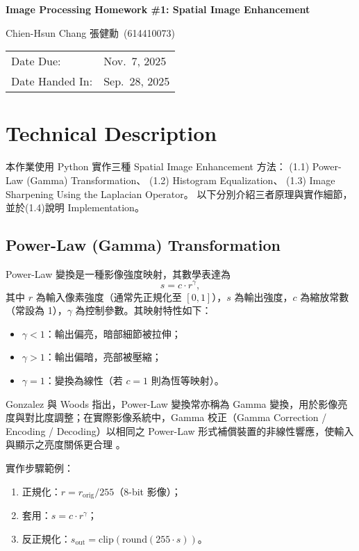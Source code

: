 \documentclass[12pt,a4paper]{article}
\newcommand{\HomeworkTitle}{Image Processing Homework \#1: Spatial Image Enhancement}
\newcommand{\StudentName}{Chien-Hsun Chang 張健勳}
\newcommand{\StudentID}{614410073}
\newcommand{\StudentInfo}{\StudentName~(\StudentID)}
\newcommand{\DateDue}{Nov.\ 7, 2025}
\newcommand{\DateHandedIn}{Sep.\ 28, 2025}
\begin{document}
\begin{titlepage}
  \centering
  {\vspace*{2cm}\Huge\bfseries \HomeworkTitle\par}
  \vspace{2cm}
  {\Large \StudentInfo\par}
  \vfill
  \begin{tabular}{@{}ll@{}}
    Date Due: & \DateDue \\
    Date Handed In: & \DateHandedIn \\
  \end{tabular}
  \vfill
\end{titlepage}

\section{Technical Description}
本作業使用 Python 實作三種 Spatial Image Enhancement 方法：
(1.1) Power-Law (Gamma) Transformation、
(1.2) Histogram Equalization、
(1.3) Image Sharpening Using the Laplacian Operator。
以下分別介紹三者原理與實作細節，並於(1.4)說明 Implementation。

\subsection{Power-Law (Gamma) Transformation}
Power-Law 變換是一種影像強度映射，其數學表達為
\[
s = c \cdot r^{\gamma},
\]
其中 \(r\) 為輸入像素強度（通常先正規化至 \([0,1]\)），\(s\) 為輸出強度，\(c\) 為縮放常數（常設為 1），\(\gamma\) 為控制參數。其映射特性如下：
\begin{itemize}
  \item \(\gamma < 1\)：輸出偏亮，暗部細節被拉伸；
  \item \(\gamma > 1\)：輸出偏暗，亮部被壓縮；
  \item \(\gamma = 1\)：變換為線性（若 \(c=1\) 則為恆等映射）。
\end{itemize}

Gonzalez 與 Woods 指出，Power-Law 變換常亦稱為 Gamma 變換，用於影像亮度與對比度調整；在實際影像系統中，Gamma 校正（Gamma Correction / Encoding / Decoding）以相同之 Power-Law 形式補償裝置的非線性響應，使輸入與顯示之亮度關係更合理 \cite{GonzalezWoods2018}。

實作步驟範例：
\begin{enumerate}
  \item 正規化：\( r = r_{\text{orig}}/255 \)（8-bit 影像）；
  \item 套用：\( s = c \cdot r^{\gamma} \)；
  \item 反正規化：\( s_{\text{out}} = \mathrm{clip}(\mathrm{round}(255 \cdot s)) \)。
\end{enumerate}
\end{document}
